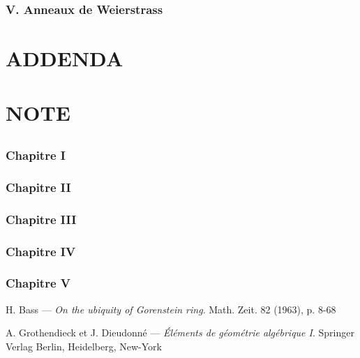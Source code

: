 \subsection*{V. Anneaux de Weierstrass}\label{sec:5}%

\chapter*{ADDENDA}\thispagestyle{empty}
\label{sec:a}
\section*{}

\chapter*{NOTE}\thispagestyle{empty}
\label{sec:a}
\section*{}

\subsection*{Chapitre I}

\subsection*{Chapitre II}

\subsection*{Chapitre III}

\subsection*{Chapitre IV}

\subsection*{Chapitre V}


\renewcommand{\bibname}{BIBLIOGRAPHIE}
\def\refname{B\MakeLowercase{IBLIOGRAPHIE}}
\begin{thebibliography}{99}\thispagestyle{empty}

  {\sc H. Bass} ---
  {\it On the ubiquity of Gorenstein ring}. Math. Zeit. 82 (1963), p. 8-68

  {\sc A. Grothendieck et J. Dieudonné} ---
  {\it Éléments de géométrie algébrique I}. Springer Verlag Berlin, Heidelberg, New-York

\end{thebibliography}



